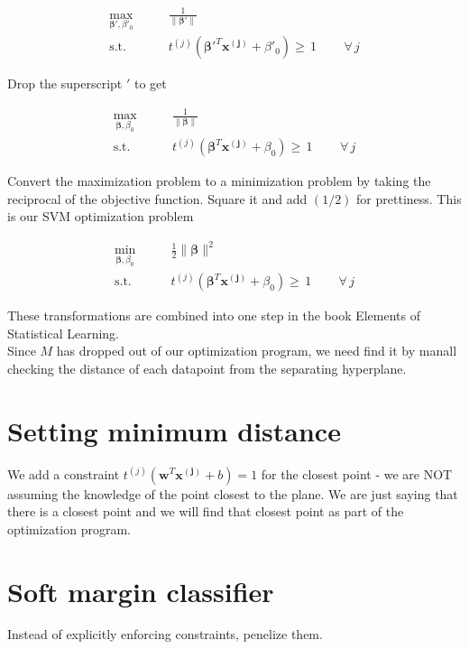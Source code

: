 \documentclass{article}
\newcommand{\beq}{\begin{equation}}
\newcommand{\eeq}{\end{equation}}
\begin{document}
\beq
\label{eqn:formulation5}
\begin{aligned}
  \max_{\pmb{\beta}',\beta'_0} &  \qquad \frac{1}{\|\pmb{\beta}'\|} \\
  \textrm{s.t.} & \qquad {t^{(j)}({\pmb{\beta}'}^T{\pmb{x^{(j)}}} + \beta'_0)} \ge\, 1  \, \qquad \forall \,{j}
\end{aligned}
\eeq

Drop the superscript $'$ to get 

\beq
\label{eqn:formulation6}
\begin{aligned}
  \max_{\pmb{\beta},\beta_0} &  \qquad \frac{1}{\|\pmb{\beta}\|} \\
  \textrm{s.t.} & \qquad {t^{(j)}({\pmb{\beta}}^T{\pmb{x^{(j)}}} + \beta_0)} \ge \, 1  \, \qquad \forall \,{j}
\end{aligned}
\eeq

Convert the maximization problem to a minimization problem by taking the reciprocal of the objective function. Square it and add $(1/2)$ for prettiness. This is our SVM optimization problem

\beq
\label{eqn:formulation7}
\begin{aligned}
  \min_{\pmb{\beta},\beta_0} &  \qquad \frac{1}{2}{\|\pmb{\beta}\|^2} \\
  \textrm{s.t.} & \qquad {t^{(j)}({\pmb{\beta}}^T{\pmb{x^{(j)}}} + \beta_0)} \ge \, 1  \, \qquad \forall \,{j}
\end{aligned}
\eeq

These transformations are combined into one step in the book Elements of Statistical Learning. \\

Since $M$ has dropped out of our optimization program, we need find it by manall checking the distance of each datapoint from the separating hyperplane.


\section{Setting minimum distance}

We add a constraint $t^{(j)}(\pmb{w}^T\pmb{x^{(j)}}+b)=1$ for the closest point - we are NOT assuming the knowledge of the point closest to the plane. We are just saying that there is a closest point and we will find that closest point as part of the optimization program.

\section{Soft margin classifier}
Instead of explicitly enforcing constraints, penelize them.
\end{document}
